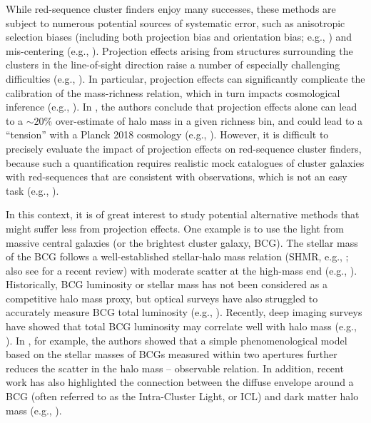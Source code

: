 \documentclass[fleqn,usenatbib,useAMS]{mnras}
\begin{document}
\begin{CJK*}{UTF8}{gbsn}
    While red-sequence cluster finders enjoy many successes, these methods are subject to numerous
    potential sources of systematic error, such as anisotropic selection biases (including both
    projection bias and orientation bias; e.g., \citealt{NohCohn2012, Dietrich2014, Osato2018,
    Herbonnet2019}) and mis-centering (e.g., \citealt{Saro2015, Zhang2019b}).
    Projection effects arising from structures surrounding the clusters in the line-of-sight
    direction raise a number of especially challenging difficulties (e.g., \citealt{Cohn2007,
    Erickson2011, Farahi2016, Zu2017, Busch2017, Costanzi2019, Sunayama2019, Sunayama2020}). 
    In particular, projection effects can significantly complicate the calibration of 
    the mass-richness relation, which in turn impacts cosmological inference 
    (e.g., \citealt{Erickson2011, Costanzi2019, Sunayama2020, Wu2021}).
    In \citet{DES2020}, the authors conclude that projection effects alone can lead to a $\sim 20$\%
    over-estimate of halo mass in a given richness bin, and could lead to a  ``tension'' with a
    Planck 2018 cosmology (e.g., \citealt{PLANCK2020}). 
    However, it is difficult to precisely evaluate the impact of projection effects on red-sequence
    cluster finders, because such a quantification requires realistic mock catalogues of cluster
    galaxies with red-sequences that are consistent with observations, which is not an easy task
    (e.g., \citealt{DeRose2019, Korytov2019}).

    In this context, it is of great interest to study potential alternative methods that might 
    suffer less from projection effects. 
    One example is to use the light from massive central galaxies (or the brightest cluster galaxy,
    BCG). The stellar mass of the BCG follows a well-established stellar-halo
    mass relation (SHMR, e.g., \citealt{Leauthaud2012, Tinker2017, Kravtsov2018}; also see
    \citealt{Wechsler2018} for a recent review) with moderate scatter at the high-mass end (e.g.,
    \citealt{More2009, Leauthaud2012, Reddick2013, Zu2015, Lehmann2017, Kravtsov2018}).
    Historically, BCG luminosity or stellar mass has not been considered as a competitive halo mass
    proxy, but optical surveys have also struggled to accurately measure BCG total luminosity (e.g.,
    \citealt{Bernardi2013, Huang2018b}). 
    Recently, deep imaging surveys have showed that total BCG luminosity may correlate well with 
    halo mass (e.g., \citealt{Huang2018c, SampaioSantos2021}).
    In \citet{Huang2020}, for example, the authors showed that a simple phenomenological model based
    on the stellar masses of BCGs measured within two apertures further reduces the scatter in the
    halo mass -- observable relation. 
    In addition, recent work has also highlighted the connection between the diffuse envelope around
    a BCG (often referred to as the Intra-Cluster Light, or ICL) and dark matter halo mass (e.g.,
    \citealt{Montes2018, Montes2019, Zhang2019b, Furnell2021}).


\end{CJK*}
\end{document}
